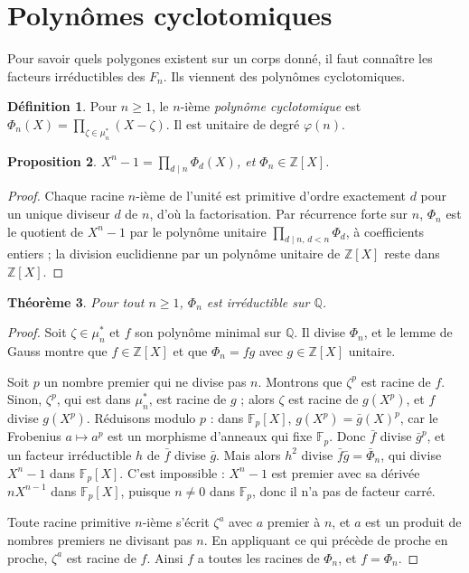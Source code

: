 \documentclass[11pt,a4paper]{article}
\theoremstyle{plain}
\newtheorem{theoreme}{Théorème}[section]
\newtheorem{proposition}[theoreme]{Proposition}
\theoremstyle{definition}
\newtheorem{definition}[theoreme]{Définition}
\theoremstyle{remark}
\newcommand{\Z}{\mathbb{Z}}
\newcommand{\Q}{\mathbb{Q}}
\newcommand{\F}{\mathbb{F}}
\begin{document}
\section{Polynômes cyclotomiques}

Pour savoir quels polygones existent sur un corps donné, il faut connaître les facteurs irréductibles des $F_n$. Ils viennent des polynômes cyclotomiques.

\begin{definition}
Pour $n\geq1$, le $n$-ième \emph{polynôme cyclotomique} est $\Phi_n(X)=\prod_{\zeta\in\mu_n^*}(X-\zeta)$. Il est unitaire de degré $\varphi(n)$.
\end{definition}

\begin{proposition}\label{prop:cyclo}
$X^n-1=\prod_{d\mid n}\Phi_d(X)$, et $\Phi_n\in\Z[X]$.
\end{proposition}

\begin{proof}
Chaque racine $n$-ième de l'unité est primitive d'ordre exactement $d$ pour un unique diviseur $d$ de $n$, d'où la factorisation. Par récurrence forte sur $n$, $\Phi_n$ est le quotient de $X^n-1$ par le polynôme unitaire $\prod_{d\mid n,\,d<n}\Phi_d$, à coefficients entiers ; la division euclidienne par un polynôme unitaire de $\Z[X]$ reste dans $\Z[X]$.
\end{proof}

\begin{theoreme}\label{thm:irred}
Pour tout $n\geq1$, $\Phi_n$ est irréductible sur $\Q$.
\end{theoreme}

\begin{proof}
Soit $\zeta\in\mu_n^*$ et $f$ son polynôme minimal sur $\Q$. Il divise $\Phi_n$, et le lemme de Gauss montre que $f\in\Z[X]$ et que $\Phi_n=fg$ avec $g\in\Z[X]$ unitaire.

Soit $p$ un nombre premier qui ne divise pas $n$. Montrons que $\zeta^p$ est racine de $f$. Sinon, $\zeta^p$, qui est dans $\mu_n^*$, est racine de $g$ ; alors $\zeta$ est racine de $g(X^p)$, et $f$ divise $g(X^p)$. Réduisons modulo $p$ : dans $\F_p[X]$, $g(X^p)=\bar g(X)^p$, car le Frobenius $a\mapsto a^p$ est un morphisme d'anneaux qui fixe $\F_p$. Donc $\bar f$ divise $\bar g^p$, et un facteur irréductible $h$ de $\bar f$ divise $\bar g$. Mais alors $h^2$ divise $\bar f\bar g=\bar\Phi_n$, qui divise $X^n-1$ dans $\F_p[X]$. C'est impossible : $X^n-1$ est premier avec sa dérivée $nX^{n-1}$ dans $\F_p[X]$, puisque $n\neq0$ dans $\F_p$, donc il n'a pas de facteur carré.

Toute racine primitive $n$-ième s'écrit $\zeta^a$ avec $a$ premier à $n$, et $a$ est un produit de nombres premiers ne divisant pas $n$. En appliquant ce qui précède de proche en proche, $\zeta^a$ est racine de $f$. Ainsi $f$ a toutes les racines de $\Phi_n$, et $f=\Phi_n$.
\end{proof}
\end{document}

